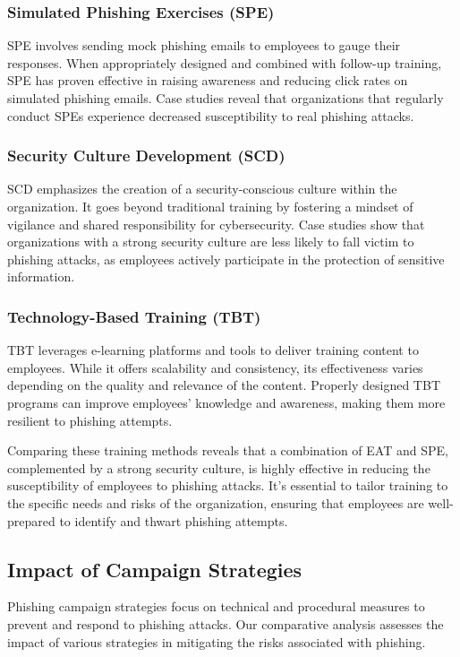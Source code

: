 \documentclass[conference]{IEEEtran}
\begin{document}
\subsubsection{Simulated Phishing Exercises (SPE)} SPE involves sending mock phishing emails to employees to gauge their responses. When appropriately designed and combined with follow-up training, SPE has proven effective in raising awareness and reducing click rates on simulated phishing emails. Case studies reveal that organizations that regularly conduct SPEs experience decreased susceptibility to real phishing attacks.

\subsubsection{Security Culture Development (SCD)} SCD emphasizes the creation of a security-conscious culture within the organization. It goes beyond traditional training by fostering a mindset of vigilance and shared responsibility for cybersecurity. Case studies show that organizations with a strong security culture are less likely to fall victim to phishing attacks, as employees actively participate in the protection of sensitive information.

\subsubsection{Technology-Based Training (TBT)} TBT leverages e-learning platforms and tools to deliver training content to employees. While it offers scalability and consistency, its effectiveness varies depending on the quality and relevance of the content. Properly designed TBT programs can improve employees' knowledge and awareness, making them more resilient to phishing attempts.

Comparing these training methods reveals that a combination of EAT and SPE, complemented by a strong security culture, is highly effective in reducing the susceptibility of employees to phishing attacks. It's essential to tailor training to the specific needs and risks of the organization, ensuring that employees are well-prepared to identify and thwart phishing attempts.

\subsection{Impact of Campaign Strategies}
Phishing campaign strategies focus on technical and procedural measures to prevent and respond to phishing attacks. Our comparative analysis assesses the impact of various strategies in mitigating the risks associated with phishing.
\end{document}
